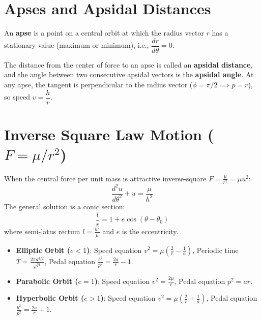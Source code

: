 \section{Apses and Apsidal Distances}

\begin{defbox}[Apse]
An \textbf{apse} is a point on a central orbit at which the radius vector $r$ has a stationary value (maximum or minimum), i.e., $\dfrac{dr}{d\theta} = 0$.

The distance from the center of force to an apse is called an \textbf{apsidal distance}, and the angle between two consecutive apsidal vectors is the \textbf{apsidal angle}.
At any apse, the tangent is perpendicular to the radius vector ($\phi = \pi/2 \implies p = r$), so speed $v = \dfrac{h}{r}$.
\end{defbox}

\section{\texorpdfstring{Inverse Square Law Motion ($F = \mu / r^2$)}{Inverse Square Law Motion (F = mu / r^2)}}

When the central force per unit mass is attractive inverse-square $F = \frac{\mu}{r^2} = \mu u^2$:
\begin{equation*}
    \frac{d^2 u}{d\theta^2} + u = \frac{\mu}{h^2}
\end{equation*}
The general solution is a conic section:
\begin{equation}
    \frac{l}{r} = 1 + e \cos(\theta - \theta_0)
\end{equation}
where semi-latus rectum $l = \frac{h^2}{\mu}$ and $e$ is the eccentricity.

\begin{keybox}
\begin{itemize}
    \item \textbf{Elliptic Orbit ($e < 1$)}: Speed equation $v^2 = \mu \left( \frac{2}{r} - \frac{1}{a} \right)$, Periodic time $T = \frac{2\pi a^{3/2}}{\sqrt{\mu}}$, Pedal equation $\frac{b^2}{p^2} = \frac{2a}{r} - 1$.
    \item \textbf{Parabolic Orbit ($e = 1$)}: Speed equation $v^2 = \frac{2\mu}{r}$, Pedal equation $p^2 = a r$.
    \item \textbf{Hyperbolic Orbit ($e > 1$)}: Speed equation $v^2 = \mu \left( \frac{2}{r} + \frac{1}{a} \right)$, Pedal equation $\frac{b^2}{p^2} = \frac{2a}{r} + 1$.
\end{itemize}
\end{keybox}

